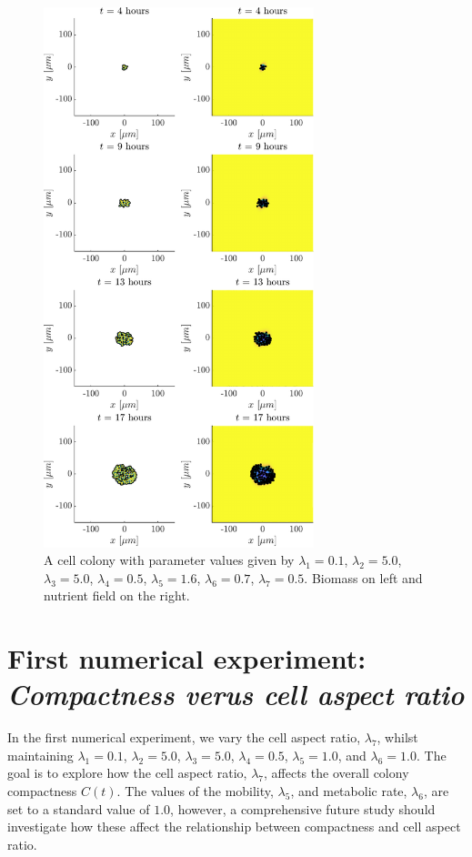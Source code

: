 \begin{figure}[!htb]
    \centering
    \includegraphics[width= 0.7\textwidth]{
        chapter4/figures/t_all_L1_0o10_L2_5o00_L3_5o00_L4_0o50_L5_1o60_L6_0o70_L7_0o50.pdf}
    \caption{A cell colony with parameter values given by
             $\lambda_1 = 0.1$,  
             $\lambda_2 = 5.0$, 
             $\lambda_3 = 5.0$, 
             $\lambda_4 = 0.5$, 
             $\lambda_5 = 1.6$, 
             $\lambda_6 = 0.7$, 
             $\lambda_7 = 0.5$. 
             Biomass on left and nutrient field on the right.}
    \label{fig:colony5}
\end{figure}


\section{First numerical experiment: \\ \textit{Compactness verus cell aspect ratio}}\label{sec:numExp1}
In the first numerical experiment, we vary the cell aspect ratio, $\lambda_7$,
whilst maintaining $\lambda_1 = 0.1$, $\lambda_2 = 5.0$, $\lambda_3 = 5.0$, $\lambda_4 = 0.5$, $\lambda_5 = 1.0$, 
and $\lambda_6 = 1.0$. The goal is to explore how the cell aspect ratio, $\lambda_7$, affects the overall 
colony compactness $C(t)$. The values of the mobility, $\lambda_5$, and metabolic rate, $\lambda_6$, are set to a standard 
value of $1.0$, however, a comprehensive future study should investigate how these affect the relationship
between compactness and cell aspect ratio.
\\

